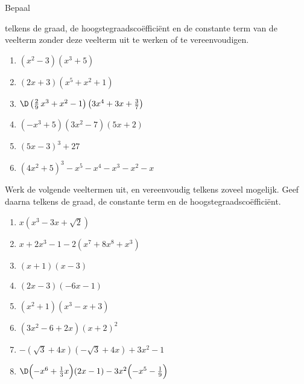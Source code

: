 \documentclass{ximera}
\begin{document}
\begin{Oefening}\setcounter{enumi}{5}
\hypertarget{oef1.5}{Bepaal} telkens de graad, de hoogstegraadsco\"effici\"ent en de constante term van de veelterm zonder deze veelterm uit te werken of te vereenvoudigen. 
\begin{multicols}{2}
\begin{enumerate}

\item
$(x^2-3)(x^3+5)$
\item
$(2x+3)(x^5+x^2+1)$
\item
$\D \left(\frac{2}{9}\,x^3+x^2-1\right)\left(3x^4+3x+\frac{3}{7}\right)$
\item
$(-x^3+5)(3x^2-7)(5x+2)$
\item
$(5x-3)^3+27$
\item
$(4x^2+5)^3-x^5-x^4-x^3-x^2-x$
\end{enumerate}
\end{multicols}
\end{Oefening}

\pagebreak

\begin{Oefening} %
Werk de volgende veeltermen uit, en vereenvoudig telkens zoveel mogelijk. Geef daarna telkens de graad, de constante term en de hoogstegraadsco\"effici\"ent.
\begin{multicols}{2}
\begin{enumerate}

\item
$x(x^3-3x+\sqrt{2})$
\item
$x+2x^3-1-2(x^7+8x^8+x^3)$
\item
$(x+1)(x-3)$
\item
$(2x-3)(-6x-1)$
\item
$(x^2+1)(x^3-x+3)$
\item
$(3x^2-6+2x)(x+2)^2$
\item
$-(\sqrt{3}+4x)(-\sqrt{3}+4x)+3x^2-1$
\item
$\D \Bigl(-x^6 + \frac{1}{3}x\Bigr)(2x-1) - 3x^2\Bigl(-x^5-\frac{1}{9}\Bigr)$
\end{enumerate}
\end{multicols} 
\end{Oefening}
\end{document}
